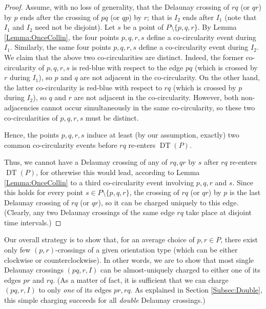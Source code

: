\documentclass[letter,11pt]{article}
\def\DT{\mathop{\mathrm{DT}}}
\begin{document}
\begin{proof}
Assume, with no loss of generality, that the Delaunay crossing of $rq$ (or $qr$) by $p$ ends after the crossing of $pq$ (or $qp$) by $r$; that is $I_2$ ends after $I_1$ (note that $I_1$ and $I_2$ need not be disjoint).
Let $s$ be a point of $P\setminus\{p,q,r\}$.
By Lemma \ref{Lemma:OnceCollin}, the four points $p,q,r,s$ define a co-circularity event during $I_1$.
Similarly, the same four points $p,q,r,s$ define a co-circularity event during $I_2$. We claim that the above two co-circularities are distinct. 
Indeed, the former co-circularity of $p,q,r,s$ is red-blue with respect to the edge $pq$ (which is crossed by $r$ during $I_1$), so $p$ and $q$ are not adjacent in the co-circularity. On the other hand, the latter co-circularity is red-blue with respect to $rq$ (which is crossed by $p$ during $I_2$), so $q$ and $r$ are not adjacent in the co-circularity. However, both non-adjacencies cannot occur simultaneously in the same co-circularity, so these two co-circularities of $p,q,r,s$ must be distinct.


Hence, the points $p,q,r,s$
induce at least (by our assumption, exactly) two common co-circularity events before $rq$ re-enters $\DT(P)$. 

Thus, we cannot have a Delaunay crossing of any of $rq,qr$ by $s$ after $rq$ re-enters $\DT(P)$, for otherwise this would lead, according to Lemma \ref{Lemma:OnceCollin} to a third co-circularity event involving $p,q,r$ and $s$. 
Since this holds for every point $s\in P\setminus \{p,q,r\}$, the crossing of $rq$ (or $qr$) by $p$ is the last Delaunay crossing of $rq$ (or $qr$), so it can be charged uniquely to this edge. (Clearly, any two Delaunay crossings of the same edge $rq$ take place at disjoint time intervals.)
\end{proof}






\smallskip

Our overall strategy is to show that, for an average choice of $p,r\in P$, there exist only few $(p,r)$-crossings of a given orientation type (which can be either clockwise or counterclockwise).
In other words, we are to show that most single Delaunay crossings $(pq,r,I)$ can be almost-uniquely charged to either one of its edges $pr$ and $rq$. (As a matter of fact, it is sufficient that we can charge $(pq,r,I)$ to only {\it one} of its edges $pr,rq$. As explained in Section \ref{Subsec:Double}, this simple charging succeeds for all {\it double} Delaunay crossings.)
\end{document}
